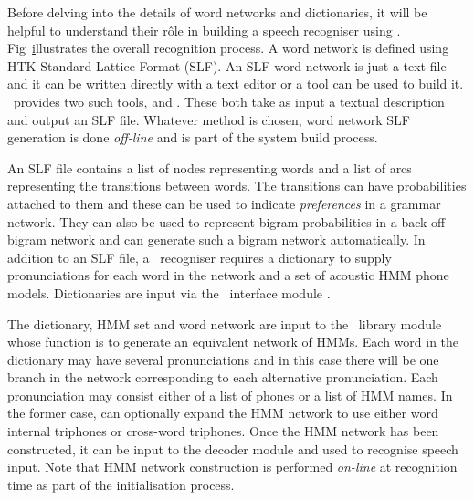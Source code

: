 
Before delving into the details of word networks and dictionaries, it will
be helpful to understand their r\^{o}le in building a speech recogniser
using \HTK.  Fig~\href{f:recsys} illustrates the overall recognition
process.  A word network is defined using HTK Standard Lattice Format
(SLF).  An SLF word network is just a text file and it can be written
directly with a text editor or a tool can be used to build it. \HTK\ provides 
two such tools,  and
.  These both take as input a textual description and
output an SLF file. 
Whatever method is chosen, word network SLF generation 
is done \textit{off-line}
and is part of the system build process.

An SLF file contains a list of nodes representing words and a
list of arcs representing the transitions between words.   The transitions
can have probabilities attached to them and these can be used to indicate
\textit{preferences} in a grammar network.  They can also be used to
represent bigram probabilities in a back-off bigram network and 
 can generate such a bigram network automatically.
In addition to an SLF file, a \HTK\ recogniser requires a 
dictionary to supply pronunciations for each word in the network
and a set of acoustic HMM phone models. 
Dictionaries are input via the \HTK\ interface module .

The dictionary, HMM set and word network are input to the \HTK\ library
module  whose function is to generate an equivalent network of
HMMs. Each word in the dictionary may have several pronunciations and in
this case there will be one branch in the network corresponding to each
alternative pronunciation. Each pronunciation may consist either of a list
of phones or a list of HMM names. In the former case,  can
optionally expand the HMM network to use either word internal triphones or
cross-word triphones.
Once the HMM network has been constructed, it can be
input to the decoder module  and used to recognise
speech input.  Note that HMM network construction is performed \textit{on-line}
at recognition time as part of the initialisation process.


